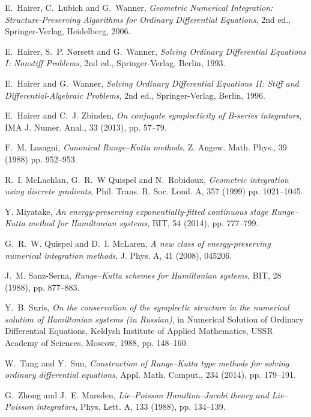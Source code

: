 \documentclass[final,leqno,onefignum,onetabnum]{siamltex1213}
\begin{document}
\begin{thebibliography}{99}
{\sc E.~Hairer, C.~Lubich and G.~Wanner},
\emph{Geometric Numerical Integration:
Structure-Preserving Algorithms for Ordinary Differential Equations},
2nd ed., Springer-Verlag, Heidelberg, 2006.

{\sc E.~Hairer, S.~P. N{\o}rsett and G.~Wanner},
\emph{Solving Ordinary Differential Equations I: Nonstiff Problems},
2nd ed., Springer-Verlag, Berlin, 1993.

{\sc E.~Hairer and G.~Wanner},
\emph{Solving Ordinary Differential Equations II: Stiff and Differential-Algebraic Problems},
2nd ed., Springer-Verlag, Berlin, 1996.

{\sc E.~Hairer and C.~J. Zbinden},
\emph{On conjugate symplecticity of B-series integrators},
IMA J. Numer. Anal., 33 (2013), pp. 57--79.

{\sc F.~M. Lasagni},
\emph{Canonical Runge--Kutta methods},
Z. Angew. Math. Phys., 39 (1988) pp. 952--953.

{\sc R.~I. McLachlan, G.~R.~W Quispel and N.~Robidoux},
\emph{Geometric integration using discrete gradients},
Phil. Trans. R. Soc. Lond. A, 357 (1999) pp. 1021--1045.

{\sc Y. Miyatake},
\emph{An energy-preserving exponentially-fitted continuous stage
Runge--Kutta method for Hamiltonian systems},
BIT, 54 (2014), pp. 777--799.

{\sc G.~R.~W. Quispel and D.~I. McLaren}, 
\emph{A new class of energy-preserving numerical integration methods},
J. Phys. A, 41 (2008), 045206.

{\sc J.~M. Sanz-Serna},
\emph{Runge--Kutta schemes for Hamiltonian systems},
BIT, 28 (1988), pp. 877--883.

{\sc Y.~B. Suris},
\emph{On the conservation of the symplectic structure in the numerical solution of Hamiltonian systems (in Russian)}, in Numerical Solution of Ordinary Differential Equations,
Keldysh Institute of Applied Mathematics, USSR Academy of Sciences, Moscow, 1988,
pp. 148--160.

{\sc W.~Tang and Y.~Sun},
\emph{Construction of Runge--Kutta type methods for solving ordinary differential equations},
Appl. Math. Comput., 234 (2014), pp. 179--191.

{\sc G.~Zhong and J.~E. Marsden},
\emph{Lie--Poisson Hamilton--Jacobi theory and Lie--Poisson integrators},
Phys. Lett. A, 133 (1988), pp. 134--139.
\end{thebibliography}
\end{document}
